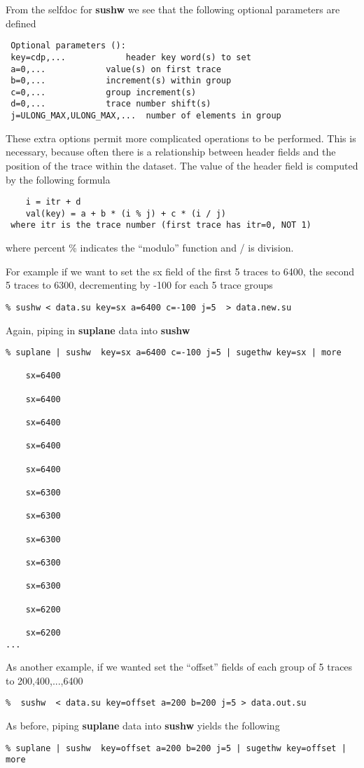 {{{From the selfdoc for {\bf sushw\/} we see that the following optional
parameters are defined
{\small\begin{verbatim}
 Optional parameters ():						
 key=cdp,...			header key word(s) to set 		
 a=0,...			value(s) on first trace			
 b=0,...			increment(s) within group		
 c=0,...			group increment(s)	 		
 d=0,...			trace number shift(s)			
 j=ULONG_MAX,ULONG_MAX,...	number of elements in group		
\end{verbatim}} \noindent
These extra options permit more complicated operations
to be performed.
This is necessary, because often there is a relationship between
header fields and the position of the trace within the dataset.
The value of the header field is computed by the following formula
{\small\begin{verbatim}
 	i = itr + d							
 	val(key) = a + b * (i % j) + c * (i / j)			
 where itr is the trace number (first trace has itr=0, NOT 1)		
\end{verbatim}} \noindent
where percent \% indicates the ``modulo'' function and / is division.

For example if we want to 
set the sx field of the first 5 traces to 6400, the second 5 traces
    to 6300, decrementing by -100 for each 5 trace groups		
{\small\begin{verbatim}
% sushw < data.su key=sx a=6400 c=-100 j=5  > data.new.su
\end{verbatim}} \noindent
Again, piping in {\bf suplane\/} data into {\bf sushw\/}
{\small\begin{verbatim}
% suplane | sushw  key=sx a=6400 c=-100 j=5 | sugethw key=sx | more

    sx=6400     

    sx=6400     

    sx=6400     

    sx=6400     

    sx=6400     

    sx=6300     

    sx=6300     

    sx=6300     

    sx=6300     

    sx=6300     

    sx=6200     

    sx=6200     
...
\end{verbatim}} \noindent

As another example, if we wanted set the ``offset'' fields of each group
of 5 traces to 200,400,...,6400
{\small\begin{verbatim}
%  sushw  < data.su key=offset a=200 b=200 j=5 > data.out.su
\end{verbatim}} \noindent
As before, piping {\bf suplane\/} data into {\bf sushw\/} yields the following
{\small\begin{verbatim}
% suplane | sushw  key=offset a=200 b=200 j=5 | sugethw key=offset | more


\end{verbatim}}}}}
